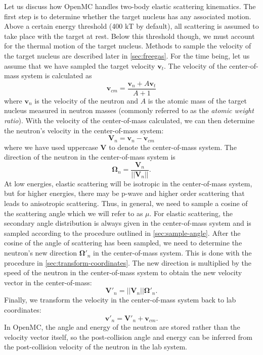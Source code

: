 Let us discuss how OpenMC handles two-body elastic scattering kinematics. The
first step is to determine whether the target nucleus has any associated
motion. Above a certain energy threshold (400 kT by default), all scattering is
assumed to take place with the target at rest. Below this threshold though, we
must account for the thermal motion of the target nucleus. Methods to sample the
velocity of the target nucleus are described later in \autoref{sec:freegas}. For
the time being, let us assume that we have sampled the target velocity
$\mathbf{v}_t$. The velocity of the center-of-mass system is calculated as
\begin{equation}
  \label{eq:velocity-com}
  \mathbf{v}_{cm} = \frac{\mathbf{v}_n + A \mathbf{v}_t}{A + 1}
\end{equation}
where $\mathbf{v}_n$ is the velocity of the neutron and $A$ is the atomic mass
of the target nucleus measured in neutron masses (commonly referred to as the
\emph{atomic weight ratio}). With the velocity of the center-of-mass calculated,
we can then determine the neutron's velocity in the center-of-mass system:
\begin{equation}
  \label{eq:velocity-neutron-com}
  \mathbf{V}_n = \mathbf{v}_n - \mathbf{v}_{cm}
\end{equation}
where we have used uppercase $\mathbf{V}$ to denote the center-of-mass
system. The direction of the neutron in the center-of-mass system is
\begin{equation}
  \label{eq:angle-neutron-com}
  \mathbf{\Omega}_n = \frac{\mathbf{V}_n}{|| \mathbf{V}_n ||}.
\end{equation}
At low energies, elastic scattering will be isotropic in the center-of-mass
system, but for higher energies, there may be p-wave and higher order scattering
that leads to anisotropic scattering. Thus, in general, we need to sample a
cosine of the scattering angle which we will refer to as $\mu$. For elastic
scattering, the secondary angle distribution is always given in the
center-of-mass system and is sampled according to the procedure outlined in
\autoref{sec:sample-angle}. After the cosine of the angle of scattering has been
sampled, we need to determine the neutron's new direction $\mathbf{\Omega}'_n$
in the center-of-mass system. This is done with the procedure in
\autoref{sec:transform-coordinates}. The new direction is multiplied by the
speed of the neutron in the center-of-mass system to obtain the new velocity
vector in the center-of-mass:
\begin{equation}
  \label{eq:velocity-neutron-com-2}
  \mathbf{V}'_n = || \mathbf{V}_n || \mathbf{\Omega}'_n.
\end{equation}
Finally, we transform the velocity in the center-of-mass system back to lab
coordinates:
\begin{equation}
  \label{eq:velocity-neutron-lab}
  \mathbf{v}'_n = \mathbf{V}'_n + \mathbf{v}_{cm}.
\end{equation}
In OpenMC, the angle and energy of the neutron are stored rather than the
velocity vector itself, so the post-collision angle and energy can be inferred
from the post-collision velocity of the neutron in the lab system.

